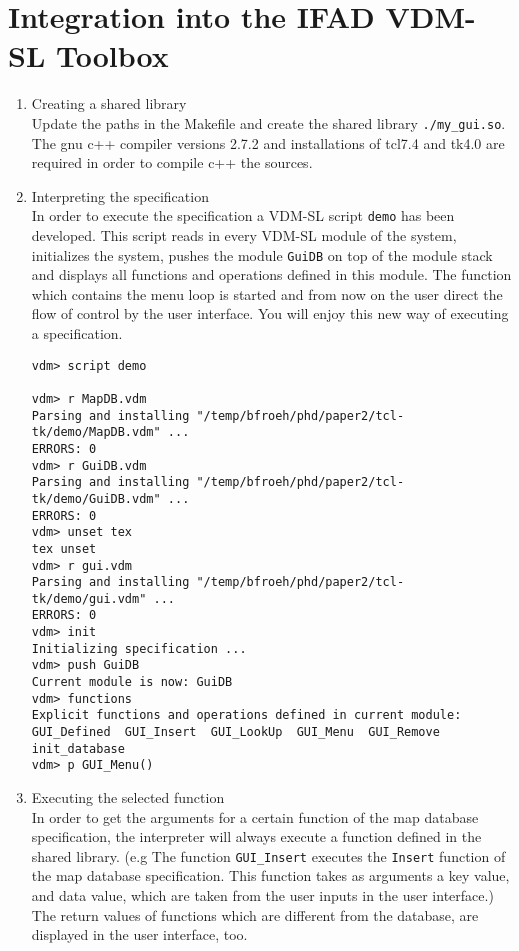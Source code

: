 \section{Integration into the IFAD VDM-SL Toolbox}
\begin{enumerate}
\item Creating a shared library\\
Update the paths in the Makefile and create the shared library 
{\tt ./my\_gui.so}. The gnu c++ compiler versions 2.7.2 and installations of
tcl7.4 and tk4.0 are required in order to compile c++ the sources.

\item Interpreting the specification\\
In order to execute the specification a VDM-SL script {\tt demo} has been
developed. This script reads in every VDM-SL module of the system, initializes
the system, pushes the module {\tt GuiDB} on top of the module stack and
displays all functions and operations defined in this module.
The function which contains the menu loop is started and from now on the
user direct the flow of control by the user interface.
You will enjoy this new way of executing a specification.

\begin{verbatim}
vdm> script demo

vdm> r MapDB.vdm
Parsing and installing "/temp/bfroeh/phd/paper2/tcl-tk/demo/MapDB.vdm" ...
ERRORS: 0
vdm> r GuiDB.vdm
Parsing and installing "/temp/bfroeh/phd/paper2/tcl-tk/demo/GuiDB.vdm" ...
ERRORS: 0
vdm> unset tex
tex unset
vdm> r gui.vdm
Parsing and installing "/temp/bfroeh/phd/paper2/tcl-tk/demo/gui.vdm" ...
ERRORS: 0
vdm> init
Initializing specification ...
vdm> push GuiDB
Current module is now: GuiDB
vdm> functions
Explicit functions and operations defined in current module:
GUI_Defined  GUI_Insert  GUI_LookUp  GUI_Menu  GUI_Remove  init_database  
vdm> p GUI_Menu()
\end{verbatim}

\item Executing the selected function\\
In order to get the arguments for a certain function of the
 map database specification, the interpreter will always execute a 
function defined in the shared library.
(e.g The function {\tt GUI\_Insert} executes the {\tt Insert} function of the
map database specification. This function takes as arguments a key value, and
data value, which are taken from the user inputs in the user interface.)
The return values of functions which are different from the database, are
displayed in the user interface, too.
\end{enumerate}


